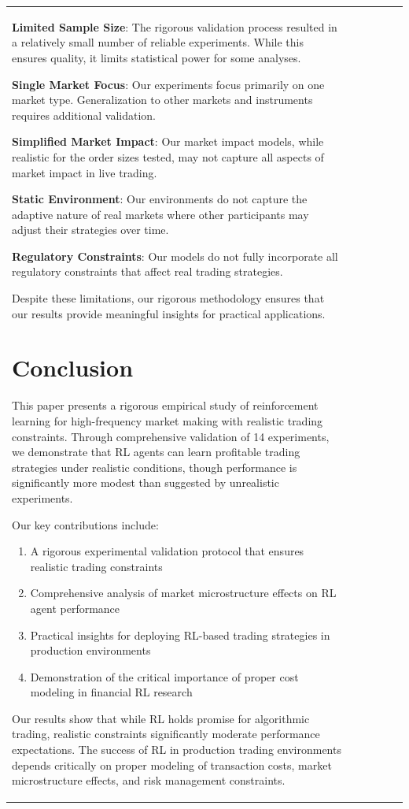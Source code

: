 \documentclass[11pt,a4paper]{article}
\begin{document}
\begin{table}[h]
\begin{tabular}{|l|c|c|c|c|c|}
\textbf{Limited Sample Size}: The rigorous validation process resulted in a relatively small number of reliable experiments. While this ensures quality, it limits statistical power for some analyses.

\textbf{Single Market Focus}: Our experiments focus primarily on one market type. Generalization to other markets and instruments requires additional validation.

\textbf{Simplified Market Impact}: Our market impact models, while realistic for the order sizes tested, may not capture all aspects of market impact in live trading.

\textbf{Static Environment}: Our environments do not capture the adaptive nature of real markets where other participants may adjust their strategies over time.

\textbf{Regulatory Constraints}: Our models do not fully incorporate all regulatory constraints that affect real trading strategies.

Despite these limitations, our rigorous methodology ensures that our results provide meaningful insights for practical applications.
\n\n
\section{Conclusion}
\label{sec:conclusion}

This paper presents a rigorous empirical study of reinforcement learning for high-frequency market making with realistic trading constraints. Through comprehensive validation of 14 experiments, we demonstrate that RL agents can learn profitable trading strategies under realistic conditions, though performance is significantly more modest than suggested by unrealistic experiments.

Our key contributions include:

\begin{enumerate}
\item A rigorous experimental validation protocol that ensures realistic trading constraints
\item Comprehensive analysis of market microstructure effects on RL agent performance
\item Practical insights for deploying RL-based trading strategies in production environments
\item Demonstration of the critical importance of proper cost modeling in financial RL research
\end{enumerate}

Our results show that while RL holds promise for algorithmic trading, realistic constraints significantly moderate performance expectations. The success of RL in production trading environments depends critically on proper modeling of transaction costs, market microstructure effects, and risk management constraints.


\end{tabular}
\end{table}
\end{document}
